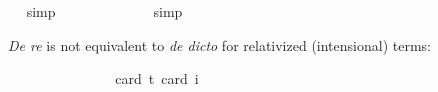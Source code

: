 \begin{isabellebody}
\isadelimproof
\ %
\endisadelimproof
%
\isatagproof
{}\isamarkupfalse%
\ simp%
\endisatagproof
{\isafoldproof}%
%
\isadelimproof
%
\endisadelimproof
\isanewline
{}\isamarkupfalse%
\ {\isachardoublequoteopen}{\isasymlfloor}\isactrlbold {\isasymforall}{\isasymalpha}{\isachardot}\ {\isacharparenleft}{\isacharparenleft}{\isasymlambda}{\isasymbeta}{\isachardot}\ \isactrlbold {\isasymbox}{\isacharparenleft}{\isasymalpha}\ {\isasymbeta}{\isacharparenright}{\isacharparenright}\ {\isacharparenleft}{\isasymtau}{\isacharcolon}{\isacharcolon}{\isasymup}{\isasymlangle}{\isasymzero}{\isasymrangle}{\isacharparenright}{\isacharparenright}\ \isactrlbold {\isasymleftrightarrow}\ \isactrlbold {\isasymbox}{\isacharparenleft}{\isacharparenleft}{\isasymlambda}{\isasymbeta}{\isachardot}\ {\isacharparenleft}{\isasymalpha}\ {\isasymbeta}{\isacharparenright}{\isacharparenright}\ {\isasymtau}{\isacharparenright}{\isasymrfloor}{\isachardoublequoteclose}%
\isadelimproof
\ %
\endisadelimproof
%
\isatagproof
{}\isamarkupfalse%
\ simp%
\endisatagproof
{\isafoldproof}%
%
\isadelimproof
%
\endisadelimproof
%
\begin{isamarkuptext}%
\emph{De re} is not equivalent to \emph{de dicto} for relativized (intensional) terms:%
\end{isamarkuptext}\isamarkuptrue%
\isamarkupfalse%
\ {\isachardoublequoteopen}{\isasymlfloor}\isactrlbold {\isasymforall}{\isasymalpha}{\isachardot}\ {\isacharparenleft}{\isacharparenleft}{\isasymlambda}{\isasymbeta}{\isachardot}\ \isactrlbold {\isasymbox}{\isacharparenleft}{\isasymalpha}\ {\isasymbeta}{\isacharparenright}{\isacharparenright}\ \isactrlbold {\isasymdownharpoonleft}{\isacharparenleft}{\isasymtau}{\isacharcolon}{\isacharcolon}{\isasymup}{\isasymzero}{\isacharparenright}{\isacharparenright}\ \isactrlbold {\isasymleftrightarrow}\ \isactrlbold {\isasymbox}{\isacharparenleft}\ {\isacharparenleft}{\isasymlambda}{\isasymbeta}{\isachardot}\ {\isacharparenleft}{\isasymalpha}\ {\isasymbeta}{\isacharparenright}{\isacharparenright}\ \isactrlbold {\isasymdownharpoonleft}{\isasymtau}{\isacharparenright}{\isasymrfloor}{\isachardoublequoteclose}\ \isanewline
\ \ \isamarkupfalse%
{\isacharbrackleft}card\ {\isacharprime}t{\isacharequal}{}{\isacharcomma}\ card\ i{\isacharequal}{}{\isacharbrackright}%
\isadelimproof
\ %
\endisadelimproof
%
\isatagproof
{}\isamarkupfalse%
\ %
%
\endisatagproof
{\isafoldproof}%
%
\isadelimproof
%
\endisadelimproof
\isanewline

\end{isabellebody}
